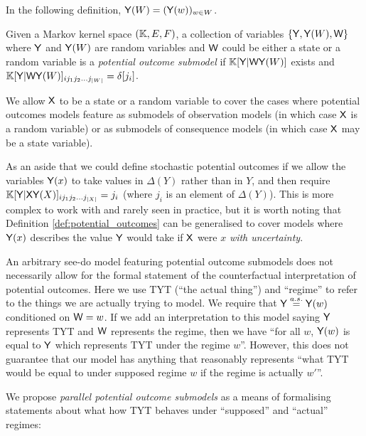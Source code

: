 In the following definition, $\mathsf{Y}(W)=(\mathsf{Y}(w))_{w\in W}$.

\begin{definition}\label{def:potential_outcomes}
Given a Markov kernel space $(\mathbb{K},E,F)$, a collection of variables $\{\mathsf{Y}, \mathsf{Y}(W), \mathsf{W}\}$ where $\mathsf{Y}$ and $\mathsf{Y}(W)$ are random variables and $\mathsf{W}$ could be either a state or a random variable is a \emph{potential outcome submodel} if $\mathbb{K}[\mathsf{Y}|\mathsf{W}\mathsf{Y}(W)]$ exists and $\mathbb{K}[\mathsf{Y}|\mathsf{W}\mathsf{Y}(W)]_{i j_1 j_2 ... j_{|W|}} = \delta[j_i]$. 
\end{definition}

We allow $\mathsf{X}$ to be a state or a random variable to cover the cases where potential outcomes models feature as submodels of observation models (in which case $\mathsf{X}$ is a random variable) or as submodels of consequence models (in which case $\mathsf{X}$ may be a state variable).

As an aside that we could define stochastic potential outcomes if we allow the variables $\mathsf{Y}(x)$ to take values in $\Delta(Y)$ rather than in $Y$, and then require $\mathbb{K}[\mathsf{Y}|\mathsf{X}\mathsf{Y}(X)]_{i j_1 j_2 ... j_{|X|}} = j_i$ (where $j_i$ is an element of $\Delta(Y)$). This is more complex to work with and rarely seen in practice, but it is worth noting that Definition \ref{def:potential_outcomes} can be generalised to cover models where $\mathsf{Y}(x)$ describes the value $\mathsf{Y}$ would take if $\mathsf{X}$ were $x$ \emph{with uncertainty}.

An arbitrary see-do model featuring potential outcome submodels does not necessarily allow for the formal statement of the counterfactual interpretation of potential outcomes. Here we use TYT (``the actual thing'') and ``regime'' to refer to the things we are actually trying to model. We require that $\mathsf{Y}\overset{a.s.}{=}\mathsf{Y}(w)$ conditioned on $\mathsf{W}=w$. If we add an interpretation to this model saying $\mathsf{Y}$ represents TYT and $\mathsf{W}$ represents the regime, then we have ``for all $w$, $\mathsf{Y}(w)$ is equal to $\mathsf{Y}$ which represents TYT under the regime $w$''. However, this does not guarantee that our model has anything that reasonably represents ``what TYT would be equal to under supposed regime $w$ if the regime is actually $w'$''.

We propose \emph{parallel potential outcome submodels} as a means of formalising statements about what how TYT behaves under ``supposed'' and ``actual'' regimes:

